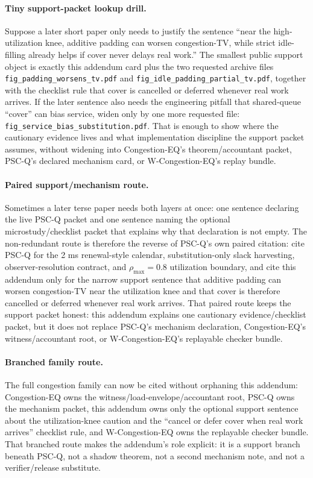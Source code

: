 \documentclass[11pt]{article}
\theoremstyle{definition}
\theoremstyle{remark}
\begin{document}
\paragraph{Tiny support-packet lookup drill.}
Suppose a later short paper only needs to justify the sentence ``near the high-utilization knee, additive padding can worsen congestion-TV, while strict idle-filling already helps if cover never delays real work.''
The smallest public support object is exactly this addendum card plus the two requested archive files \texttt{fig\_padding\_worsens\_tv.pdf} and \texttt{fig\_idle\_padding\_partial\_tv.pdf}, together with the checklist rule that cover is cancelled or deferred whenever real work arrives.
If the later sentence also needs the engineering pitfall that shared-queue ``cover'' can bias service, widen only by one more requested file: \texttt{fig\_service\_bias\_substitution.pdf}.
That is enough to show where the cautionary evidence lives and what implementation discipline the support packet assumes, without widening into Congestion-EQ's theorem/accountant packet, PSC-Q's declared mechanism card, or W-Congestion-EQ's replay bundle.

\paragraph{Paired support/mechanism route.}
Sometimes a later terse paper needs both layers at once: one sentence declaring the live PSC-Q packet and one sentence naming the optional microstudy/checklist packet that explains why that declaration is not empty.
The non-redundant route is therefore the reverse of PSC-Q's own paired citation: cite PSC-Q for the 2 ms renewal-style calendar, substitution-only slack harvesting, observer-resolution contract, and $\rho_{\max}=0.8$ utilization boundary, and cite this addendum only for the narrow support sentence that additive padding can worsen congestion-TV near the utilization knee and that cover is therefore cancelled or deferred whenever real work arrives.\cite{series:pscq}
That paired route keeps the support packet honest: this addendum explains one cautionary evidence/checklist packet, but it does not replace PSC-Q's mechanism declaration, Congestion-EQ's witness/accountant root, or W-Congestion-EQ's replayable checker bundle.

\paragraph{Branched family route.}
The full congestion family can now be cited without orphaning this addendum: Congestion-EQ owns the witness/load-envelope/accountant root, PSC-Q owns the mechanism packet, this addendum owns only the optional support sentence about the utilization-knee caution and the ``cancel or defer cover when real work arrives'' checklist rule, and W-Congestion-EQ owns the replayable checker bundle.
That branched route makes the addendum's role explicit: it is a support branch beneath PSC-Q, not a shadow theorem, not a second mechanism note, and not a verifier/release substitute.\cite{series:congeq,series:pscq,series:wcongeq}
\end{document}
